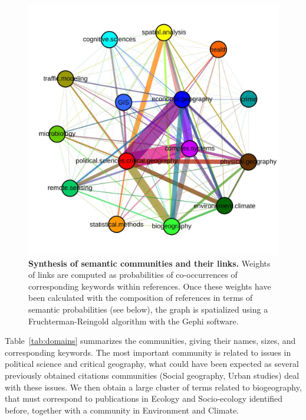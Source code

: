 \begin{figure}
\centering
\includegraphics[width=\textwidth]{figures/Fig8.jpg}
\caption{\textbf{Synthesis of semantic communities and their links.} Weights of links are computed as probabilities of co-occurrences of corresponding keywords within references. Once these weights have been calculated with the composition of references in terms of semantic probabilities (see below), the graph is spatialized using a Fruchterman-Reingold algorithm with the Gephi software.}
\label{fig:comsynthesis}
\end{figure}


Table~\ref{tab:domains} summarizes the communities, giving their names, sizes, and corresponding keywords. The most important community is related to issues in political science and critical geography, what could have been expected as several previously obtained citations communities (Social geography, Urban studies) deal with these issues. We then obtain a large cluster of terms related to biogeography, that must correspond to publications in Ecology and Socio-ecology identified before, together with a community in Environment and Climate.


